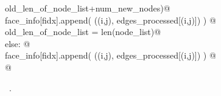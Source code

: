 \documentclass[11.5pt]{report}
\begin{document}
\begin{flushleft}
\begin{minipage}{\linewidth}
\begin{list}{}{}
\mbox{}\verb@                                             old_len_of_node_list+num_new_nodes)@\\
\mbox{}\verb@              face_info[fidx].append( ((i,j), edges_processed[(i,j)]) )  @\\
\mbox{}\verb@              old_len_of_node_list = len(node_list)@\\
\mbox{}\verb@      else: @\\
\mbox{}\verb@              face_info[fidx].append( ((i,j), edges_processed[(i,j)]) )  @\\
\mbox{}\verb@             @\\
\mbox{}\verb@@{\NWsep}
\end{list}
\vspace{-1.5ex}
\footnotesize
\begin{list}{}{\setlength{\itemsep}{-\parsep}\setlength{\itemindent}{-\leftmargin}}
\item \NWtxtMacroRefIn\ .

\item{}
\end{list}
\end{minipage}\vspace{4ex}
\end{flushleft}
\end{document}
